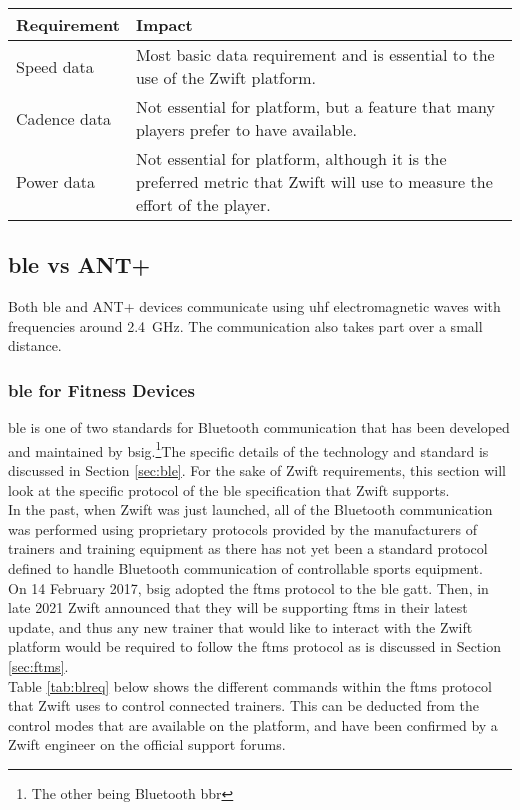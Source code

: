 \begin{table}[h!]
	\renewcommand{\arraystretch}{1.5}
	\centering
	\begin{tabularx}{0.8\textwidth}{ p{3cm} X}
		\toprule
		Requirement  & Impact                                                                                                                   \\
		\midrule
		Speed data   & Most basic data requirement and is essential to the use of the Zwift platform.                                           \\
		Cadence data & Not essential for platform, but a feature that many players prefer to have available.                                    \\
		Power data   & Not essential for platform, although it is the preferred metric that Zwift will use to measure the effort of the player. \\
		\bottomrule
	\end{tabularx}
\end{table}

\subsection{\ac{ble} vs ANT+}
Both \ac{ble} and ANT+ devices communicate using \ac{uhf} electromagnetic waves with frequencies around \SI{2.4}{\giga\hertz}. The communication also takes part over a small distance.

\subsubsection{\ac{ble} for Fitness Devices}
\ac{ble} is one of two standards for Bluetooth communication that has been developed and maintained by \ac{bsig}.\footnote{The other being Bluetooth \ac{bbr}}The specific details of the technology and standard is discussed in Section \ref{sec:ble}. For the sake of Zwift requirements, this section will look at the specific protocol of the \ac{ble} specification that Zwift supports.\\
In the past, when Zwift was just launched, all of the Bluetooth communication was performed using proprietary protocols provided by the manufacturers of trainers and training equipment as there has not yet been a standard protocol defined to handle Bluetooth communication of controllable sports equipment. \\
On 14 February 2017, \ac{bsig} adopted the \ac{ftms} protocol to the \ac{ble} \ac{gatt}. Then, in late 2021 Zwift announced that they will be supporting \ac{ftms} in their latest update, and thus any new trainer that would like to interact with the Zwift platform would be required to follow the \ac{ftms} protocol as is discussed in Section \ref{sec:ftms}. \citep{Jeremy:2021}\\
Table \ref{tab:blreq} below shows the different commands within the \ac{ftms} protocol that Zwift uses to control connected trainers. This can be deducted from the control modes that are available on the platform, and have been confirmed by a Zwift engineer on the official support forums.

